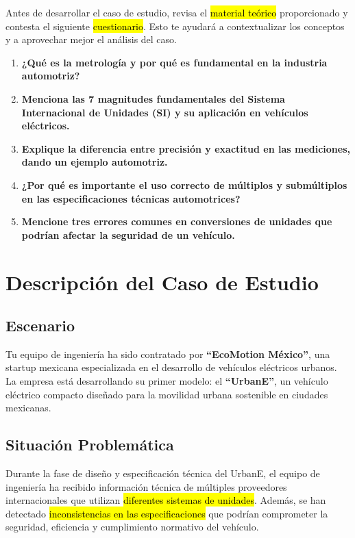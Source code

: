 \documentclass{article}
\begin{document}
Antes de desarrollar el caso de estudio, revisa el \hl{material teórico} proporcionado y contesta el siguiente \hl{cuestionario}. Esto te ayudará a contextualizar los conceptos y a aprovechar mejor el análisis del caso.

\begin{enumerate}
    \item \textbf{¿Qué es la metrología y por qué es fundamental en la industria automotriz?}
    \item \textbf{Menciona las 7 magnitudes fundamentales del Sistema Internacional de Unidades (SI) y su aplicación en vehículos eléctricos.}
    \item \textbf{Explique la diferencia entre precisión y exactitud en las mediciones, dando un ejemplo automotriz.}
    \item \textbf{¿Por qué es importante el uso correcto de múltiplos y submúltiplos en las especificaciones técnicas automotrices?}
    \item \textbf{Mencione tres errores comunes en conversiones de unidades que podrían afectar la seguridad de un vehículo.}
\end{enumerate}

\section*{Descripción del Caso de Estudio}

\subsection*{Escenario}

Tu equipo de ingeniería ha sido contratado por \textbf{``EcoMotion México''}, una startup mexicana especializada en el desarrollo de vehículos eléctricos urbanos. La empresa está desarrollando su primer modelo: el \textbf{``UrbanE''}, un vehículo eléctrico compacto diseñado para la movilidad urbana sostenible en ciudades mexicanas.

\subsection*{Situación Problemática}

Durante la fase de diseño y especificación técnica del UrbanE, el equipo de ingeniería ha recibido información técnica de múltiples proveedores internacionales que utilizan \hl{diferentes sistemas de unidades}. Además, se han detectado \hl{inconsistencias en las especificaciones} que podrían comprometer la seguridad, eficiencia y cumplimiento normativo del vehículo.
\end{document}
